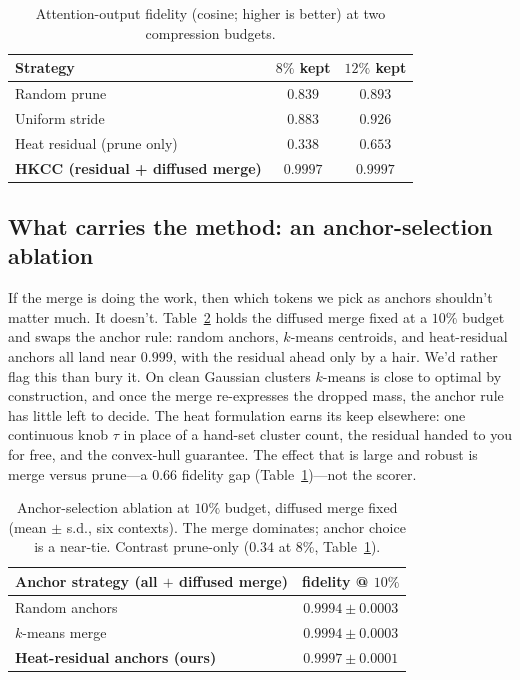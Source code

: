 \documentclass[11pt]{article}
\begin{document}
\begin{table}[t]
\centering
\caption{Attention-output fidelity (cosine; higher is better) at two compression budgets.}
\label{tab:fidelity}
\begin{tabular}{lcc}
\toprule
Strategy & $8\%$ kept & $12\%$ kept \\
\midrule
Random prune & $0.839$ & $0.893$ \\
Uniform stride & $0.883$ & $0.926$ \\
Heat residual (prune only) & $0.338$ & $0.653$ \\
\textbf{HKCC (residual + diffused merge)} & $\mathbf{0.9997}$ & $\mathbf{0.9997}$ \\
\bottomrule
\end{tabular}
\end{table}

\subsection{What carries the method: an anchor-selection ablation}
\label{sec:ablation}
If the merge is doing the work, then which tokens we pick as anchors shouldn't matter much. It
doesn't. Table~\ref{tab:ablation} holds the diffused merge fixed at a $10\%$ budget and swaps the
anchor rule: random anchors, $k$-means centroids, and heat-residual anchors all land near $0.999$,
with the residual ahead only by a hair. We'd rather flag this than bury it. On clean Gaussian
clusters $k$-means is close to optimal by construction, and once the merge re-expresses the dropped
mass, the anchor rule has little left to decide. The heat formulation earns its keep elsewhere: one
continuous knob $\tau$ in place of a hand-set cluster count, the residual handed to you for free,
and the convex-hull guarantee. The effect that is large and robust is merge versus prune---a $0.66$
fidelity gap (Table~\ref{tab:fidelity})---not the scorer.

\begin{table}[t]
\centering
\caption{Anchor-selection ablation at $10\%$ budget, diffused merge fixed (mean $\pm$ s.d., six
contexts). The merge dominates; anchor choice is a near-tie. Contrast prune-only ($0.34$ at $8\%$,
Table~\ref{tab:fidelity}).}
\label{tab:ablation}
\begin{tabular}{lc}
\toprule
Anchor strategy (all $+$ diffused merge) & fidelity @ $10\%$ \\
\midrule
Random anchors & $0.9994\pm0.0003$ \\
$k$-means merge & $0.9994\pm0.0003$ \\
\textbf{Heat-residual anchors (ours)} & $\mathbf{0.9997}\pm0.0001$ \\
\bottomrule
\end{tabular}
\end{table}
\end{document}

